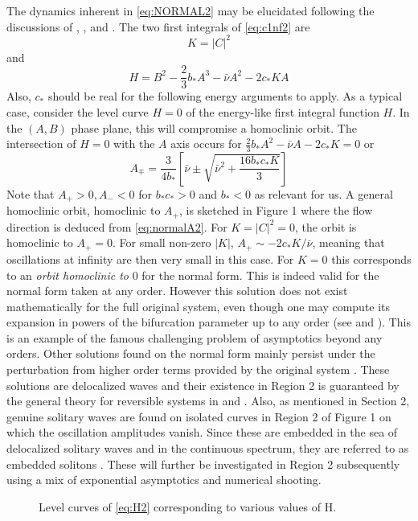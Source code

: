 The dynamics inherent in \eqref{eq:NORMAL2} may be elucidated following the
discussions of \cite{IA}, \cite{IK}, \cite{Lombardi1} and \cite{Lombardi2}.
The two first integrals of \eqref{eq:c1nf2}  are
\begin{equation}
K = \left| C \right|^2
\end{equation}
and
\begin{equation}\label{eq:H2}
H = B^2 - \frac{2}{3} b_* A^3 - \bar{\nu} A^2 - 2 c_* K A
\end{equation}
Also, $c_*$ should be real  for the following energy arguments to apply.
As a typical case, consider  the level curve $H=0$ of the energy-like first
integral function $H$. In the $(A,B)$ phase plane, this will compromise a
homoclinic orbit. The intersection of $H=0$ with the $A$ axis occurs for $
\frac{2}{3} b_* A^2 - \bar{\nu}A - 2 c_* K = 0$ or
\begin{equation}
A_{\mp} = \frac{3}{4 b_*} \left[ \bar{\nu} \pm \sqrt{ \bar{\nu}^2 + \frac{16 b_* c_* K}{3} } \right]
\end{equation}
Note that $A_+ > 0, A_- < 0 $ for $b_* c_* > 0 $ and $b_* < 0$ as relevant for
us. A general homoclinic orbit, homoclinic to $A_+$, is sketched in Figure 1
where the flow direction is deduced from \eqref{eq:normalA2}.  For
$K=\left|C\right|^2 = 0 $, the orbit is homoclinic to $A_+=0$. For small
non-zero $\left|K\right|$, $ A_+ \sim - 2 c_* K / \bar{\nu}$, meaning that
oscillations at infinity are then very small in this case. For $K=0$ this
corresponds to an \emph{orbit homoclinic to} 0 for the normal form. This is indeed
valid for the normal form taken at any order. However this solution does not
exist mathematically for the full original system, even though one may compute
its expansion in powers of the bifurcation parameter up to any order (see
\cite{Lombardi1} and \cite{Lombardi2}). This is an example of the famous
challenging problem of asymptotics beyond any orders. Other solutions found on
the normal form mainly persist under the perturbation from higher order terms
provided by the original system \cite{IK}. These solutions are delocalized
waves and their existence in Region 2 is guaranteed by the general theory for
reversible systems in \cite{Lombardi1} and \cite{Lombardi2}. Also, as mentioned
in Section 2, genuine solitary waves are found on isolated curves in Region 2
of Figure 1 on which the oscillation amplitudes vanish. Since these are
embedded in the sea of delocalized solitary waves and in the continuous
spectrum, they are referred to as embedded solitons \cite{CMYK}. These will
further be investigated in Region 2 subsequently using a mix of exponential
asymptotics and numerical shooting.

\begin{figure}[hh]
\begin{center}
\label{fig:homoclinic}
\caption{Level curves of \eqref{eq:H2} corresponding to various values of H.}
\end{center}
\end{figure}


